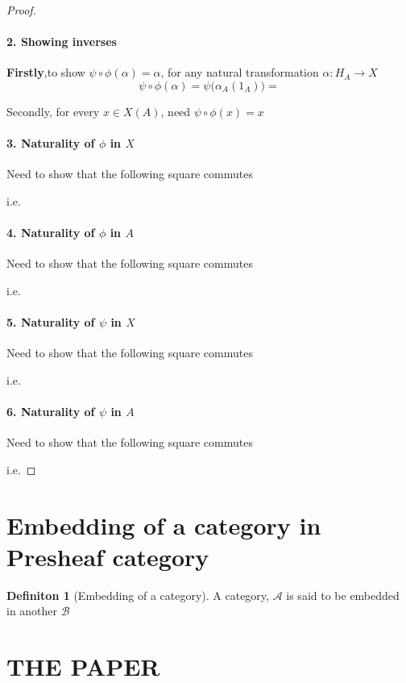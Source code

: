 \documentclass[18pt,a4paper]{extarticle}
\theoremstyle{theorem}
\theoremstyle{definition}
\newtheorem{definition}{Definiton}[section]
\theoremstyle{lemma}
\begin{document}
\begin{proof}
	\paragraph {2. Showing inverses} \textbf{Firstly},to show $\psi \circ \phi (\alpha) = \alpha $,
	for any natural transformation $\alpha: H_A \to X$\\

	\[ \psi \circ \phi (\alpha) = \psi \Big(\alpha_A(1_A) \Big) =  \]

	Secondly, for every $x \in X(A)$, need $\psi \circ \phi (x) = x$

	\paragraph{3. Naturality of $\phi$ in $X$}
	Need to show that the following square commutes

	i.e.
	\paragraph{4. Naturality of $\phi$ in $A$}
	Need to show that the following square commutes

	i.e.
	\paragraph{5. Naturality of $\psi$ in $X$}
	Need to show that the following square commutes

	i.e.
	\paragraph{6. Naturality of $\psi$ in $A$}
	Need to show that the following square commutes

	i.e.

\end{proof}
\section{Embedding of a category in Presheaf category}%

\begin{definition}[Embedding of a category] %
A category, $\mathcal{A}$  is said to be embedded in another $\mathcal{B}$
\end{definition} %


\newpage
\section{THE PAPER}%
\end{document}
